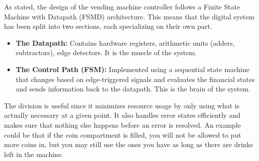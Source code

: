 As stated, the design of the vending machine controller follows a Finite State Machine with Datapath (FSMD) architecture. This means that the digital system has been split into two sections, each specializing on their own part.
\begin{itemize}
    \item \textbf{The Datapath:} Contains hardware registers, arithmetic units (adders, subtractors), edge detectors. It is the muscle of the system.
    \item \textbf{The Control Path (FSM): } Implemented using a sequential state machine that changes based on edge-triggered signals and evaluates the financial states and sends information back to the datapath. This is the brain of the system.
\end{itemize}
The division is useful since it minimizes resource usage by only using what is actually necessary at a given point. It also handles error states efficiently and makes sure that nothing else happens before an error is resolved.
An example could be that if the coin compartment is filled, you will not be allowed to put more coins in, but you may still use the ones you have as long as there are drinks left in the machine.

